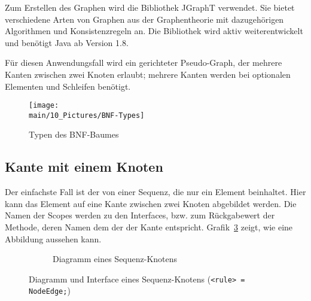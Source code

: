 \documentclass[../InterneDSLs.tex]{subfiles}
\begin{document}
Zum Erstellen des Graphen wird die Bibliothek JGraphT\cite{JGraphT} verwendet. Sie bietet verschiedene Arten von Graphen aus der Graphentheorie mit dazugehörigen Algorithmen und Konsistenzregeln an. Die Bibliothek wird aktiv weiterentwickelt und benötigt Java ab Version 1.8.

Für diesen Anwendungsfall wird ein gerichteter Pseudo-Graph, der mehrere Kanten zwischen zwei Knoten erlaubt; mehrere Kanten werden bei optionalen Elementen und Schleifen benötigt.

\begin{figure}[ht]
\centering
\texttt{[image: \\main/10\_Pictures/BNF-Types]}
\caption{Typen des BNF-Baumes}
\label{FIG:TypesBNF}
\end{figure}

\subsection{Kante mit einem Knoten}
Der einfachste Fall ist der von einer Sequenz, die nur ein Element beinhaltet. Hier kann das Element auf eine Kante zwischen zwei Knoten abgebildet werden. Die Namen der Scopes werden zu den Interfaces, bzw. zum Rückgabewert der Methode, deren Namen dem der der Kante entspricht. Grafik~\ref{FIG:OneElementNode} zeigt, wie eine Abbildung aussehen kann.
\begin{figure}[ht]
\centering
  \begin{subfigure}[c]{0.49\textwidth}
    \caption{Diagramm eines Sequenz-Knotens}
    \label{FIG:DiagramOneElementNode}
  \end{subfigure}
  \begin{subfigure}[c]{0.49\textwidth}
    
  \end{subfigure}
  \caption{Diagramm und Interface eines Sequenz-Knotens (\texttt{<rule> = NodeEdge;})}
  \label{FIG:OneElementNode}
\end{figure}
\end{document}
